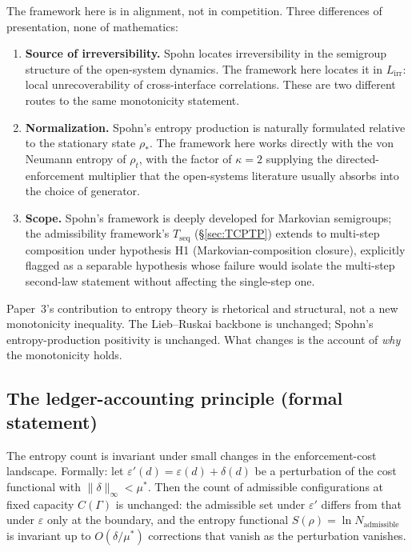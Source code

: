 \documentclass[11pt]{article}
\theoremstyle{remark}
\begin{document}
The framework here is in alignment, not in competition.  Three differences
of presentation, none of mathematics:
\begin{enumerate}
  \item \textbf{Source of irreversibility.}  Spohn locates irreversibility
  in the semigroup structure of the open-system dynamics.  The framework
  here locates it in $L_{\mathrm{irr}}$: local unrecoverability of
  cross-interface correlations.  These are two different routes to the
  same monotonicity statement.
  \item \textbf{Normalization.}  Spohn's entropy production is naturally
  formulated relative to the stationary state $\rho_*$.  The framework
  here works directly with the von Neumann entropy of $\rho_t$, with the
  factor of $\kappa = 2$ supplying the directed-enforcement multiplier
  that the open-systems literature usually absorbs into the choice of
  generator.
  \item \textbf{Scope.}  Spohn's framework is deeply developed for
  Markovian semigroups; the admissibility framework's $T_{\mathrm{seq}}$
  (\S\ref{sec:TCPTP}) extends to multi-step composition under hypothesis
  H1 (Markovian-composition closure), explicitly flagged as a separable
  hypothesis whose failure would isolate the multi-step second-law
  statement without affecting the single-step one.
\end{enumerate}
Paper~3's contribution to entropy theory is rhetorical and structural,
not a new monotonicity inequality.  The Lieb--Ruskai backbone is unchanged;
Spohn's entropy-production positivity is unchanged.  What changes is the
account of \emph{why} the monotonicity holds.

\subsection{The ledger-accounting principle (formal statement)}

\begin{tcolorbox}[apfbox, title={Proposition 4.2 (Ledger-Accounting Principle)}]
The entropy count is invariant under small changes in the enforcement-cost
landscape.  Formally: let $\varepsilon'(d) = \varepsilon(d) + \delta(d)$ be
a perturbation of the cost functional with $\|\delta\|_\infty < \mu^*$.
Then the count of admissible configurations at fixed capacity $C(\Gamma)$ is
unchanged: the admissible set under $\varepsilon'$ differs from that under
$\varepsilon$ only at the boundary, and the entropy functional $S(\rho) = \ln N_{\mathrm{admissible}}$
is invariant up to $O(\delta/\mu^*)$ corrections that vanish as the
perturbation vanishes.
\end{tcolorbox}
\end{document}
